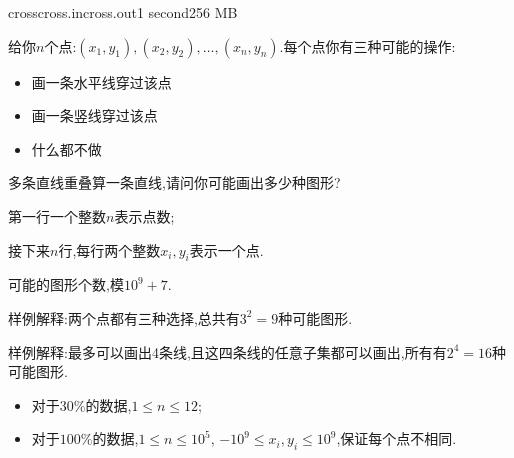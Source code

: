 \documentclass[11pt,a4paper,oneside]{article}
\begin{document}
\begin{problem}{cross}{cross.in}{cross.out}{1 second}{256 MB}
    
    给你$n$个点:$(x_1,y_1),(x_2,y_2),\dots,(x_n,y_n)$.每个点你有三种可能的操作:
    \begin{itemize}
    	\item 画一条水平线穿过该点
    	\item 画一条竖线穿过该点
    	\item 什么都不做
    \end{itemize}

	多条直线重叠算一条直线,请问你可能画出多少种图形?

    \InputFile

    第一行一个整数$n$表示点数;
    
    接下来$n$行,每行两个整数$x_i,y_i$表示一个点.

    \OutputFile

	可能的图形个数,模$10^9+7$.

    \Example

    \begin{example}
    \end{example}
	样例解释:两个点都有三种选择,总共有$3^2 = 9$种可能图形.
	
	\begin{example}
	\end{example}
	样例解释:最多可以画出4条线,且这四条线的任意子集都可以画出,所有有$2^4 = 16$种可能图形.

    \Note
    
    \begin{itemize}
    	\item 对于$30\%$的数据,$1 \leq n \leq 12$;
        \item 对于$100\%$的数据,$1 \leq n \leq 10^5$, $-10^9 \leq x_i, y_i \leq 10^9$,保证每个点不相同.
    \end{itemize}

\end{problem}
\end{document}
